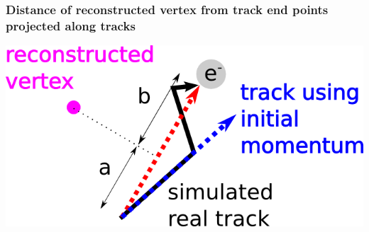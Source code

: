 \documentclass{beamer}
\begin{document}
\begin{frame}
	\frametitle{Distance of reconstructed vertex from track end points projected along tracks}
	\begin{center}
		\includegraphics[height=0.4\textheight]{vertex_distance_definition.png}
	\end{center}
\end{frame}
\end{document}
